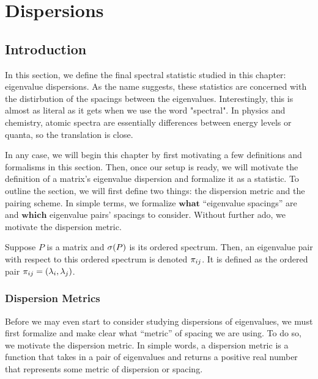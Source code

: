 
\chapter{Dispersions}

\section{Introduction}

In this section, we define the final spectral statistic studied in this chapter: eigenvalue dispersions. As the name suggests, these statistics are concerned with the distirbution of the spacings between the eigenvalues. Interestingly, this is almost as literal as it gets when we use the word "spectral". In physics and chemistry, atomic spectra are essentially differences between energy levels or quanta, so the translation is close.

In any case, we will begin this chapter by first motivating a few definitions and formalisms in this section. Then, once our setup is ready, we will motivate the definition of a matrix's eigenvalue dispersion and formalize it as a statistic. To outline the section, we will first define two things: the dispersion metric and the pairing scheme. In simple terms, we formalize $\textbf{what}$ ``eigenvalue spacings'' are and $\textbf{which}$ eigenvalue pairs' spacings to consider. Without further ado, we motivate the dispersion metric.

\begin{definition}
  Suppose $P$ is a matrix and $\sigma(P)$ is its ordered spectrum. Then, an eigenvalue pair with respect to this ordered spectrum is denoted ${\pi_{ij}}$. It is defined as the ordered pair ${\pi_{ij}} = (\lambda_i, \lambda_j)$.
\end{definition}


\subsection{Dispersion Metrics}

Before we may even start to consider studying dispersions of eigenvalues, we must first formalize and make clear what ``metric'' of spacing we are using. To do so, we motivate the dispersion metric. In simple words, a dispersion metric is a function that takes in a pair of eigenvalues and returns a positive real number that represents some metric of dispersion or spacing.

